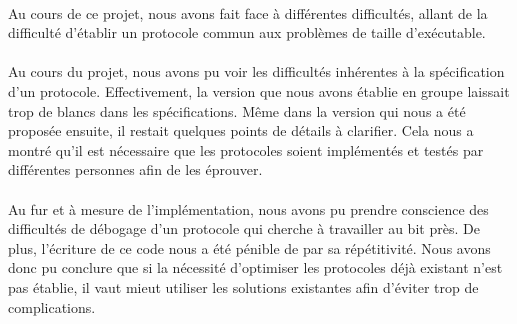 \paragraph{}
Au cours de ce projet, nous avons fait face à différentes difficultés, allant
de la difficulté d'établir un protocole commun aux problèmes de taille
d'exécutable.

\paragraph{}
Au cours du projet, nous avons pu voir les difficultés inhérentes à la
spécification d'un protocole. Effectivement, la version que nous avons établie
en groupe laissait trop de blancs dans les spécifications. Même dans la
version qui nous a été proposée ensuite, il restait quelques points de détails
à clarifier. Cela nous a montré qu'il est nécessaire que les protocoles
soient implémentés et testés par différentes personnes afin de les éprouver.

\paragraph{}
Au fur et à mesure de l'implémentation, nous avons pu prendre conscience des
difficultés de débogage d'un protocole qui cherche à travailler au bit près.
De plus, l'écriture de ce code nous a été pénible de par sa répétitivité. Nous
avons donc pu conclure que si la nécessité d'optimiser les protocoles déjà
existant n'est pas établie, il vaut mieut utiliser les solutions existantes
afin d'éviter trop de complications.
